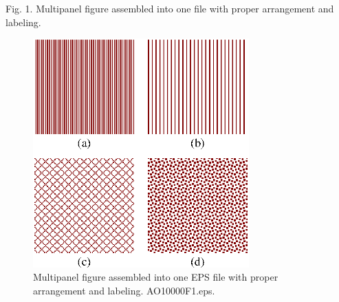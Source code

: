 \documentclass[letterpaper,11pt]{article}   %
\begin{document}
Fig. 1. Multipanel figure assembled into one file with proper
arrangement and labeling.



\newpage


  \begin{figure}[htbp]
  \centering
  \includegraphics[width=8.3cm]{OT10000F1.eps}
  \caption{Multipanel figure assembled into one EPS file with proper arrangement and labeling. AO10000F1.eps.}
  \end{figure}
\end{document}
